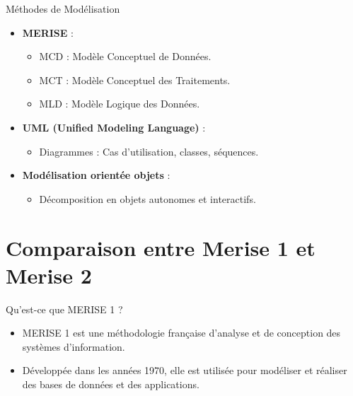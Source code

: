 \documentclass{beamer}
\begin{document}
\begin{frame}{Méthodes de Modélisation}
    \begin{itemize}
        \item \textbf{MERISE} :
        \begin{itemize}
            \item MCD : Modèle Conceptuel de Données.
            \item MCT : Modèle Conceptuel des Traitements.
            \item MLD : Modèle Logique des Données.
        \end{itemize}
        \item \textbf{UML (Unified Modeling Language)} :
        \begin{itemize}
            \item Diagrammes : Cas d'utilisation, classes, séquences.
        \end{itemize}
        \item \textbf{Modélisation orientée objets} :
        \begin{itemize}
            \item Décomposition en objets autonomes et interactifs.
        \end{itemize}
    \end{itemize}
\end{frame}



\section{Comparaison entre Merise 1 et Merise 2}

\begin{frame}{Qu'est-ce que MERISE 1 ?}
\begin{itemize}
    \item MERISE 1 est une méthodologie française d’analyse et de conception des systèmes d’information.
    \item Développée dans les années 1970, elle est utilisée pour modéliser et réaliser des bases de données et des applications.
\end{itemize}
\end{frame}
\end{document}
